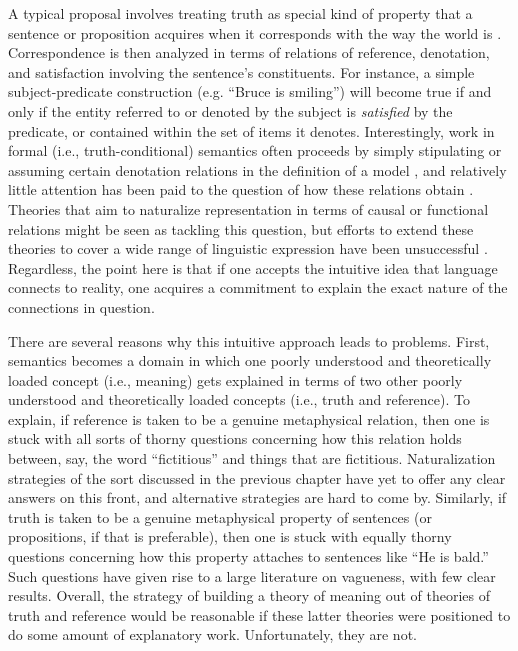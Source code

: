 A typical proposal involves treating truth as special kind of property that a sentence or proposition acquires when it corresponds with the way the world is \citep{Glanzberg:2013}. Correspondence is then analyzed in terms of relations of reference, denotation, and satisfaction involving the sentence's constituents. For instance, a simple subject-predicate construction (e.g. ``Bruce is smiling'') will become true if and only if the entity referred to or denoted by the subject is \textit{satisfied} by the predicate, or contained within the set of items it denotes. Interestingly, work in formal (i.e., truth-conditional) semantics often proceeds by simply stipulating or assuming certain denotation relations in the definition of a model \citep{Carpenter:1997}, and relatively little attention has been paid to the question of how these relations obtain \citep{Stanley:2008}. Theories that aim to naturalize representation in terms of causal or functional relations might be seen as tackling this question, but efforts to extend these theories to cover a wide range of linguistic expression have been unsuccessful \citep[c.f.][]{Millikan:2005}. Regardless, the point here is that if one accepts the intuitive idea that language connects to reality, one acquires a commitment to explain the exact nature of the connections in question.

There are several reasons why this intuitive approach leads to problems. First, semantics becomes a domain in which one poorly understood and theoretically loaded concept (i.e., meaning) gets explained in terms of two other poorly understood and theoretically loaded concepts (i.e., truth and reference). To explain, if reference is taken to be a genuine metaphysical relation, then one is stuck with all sorts of thorny questions concerning how this relation holds between, say, the word ``fictitious'' and things that are fictitious. Naturalization strategies of the sort discussed in the previous chapter have yet to offer any clear answers on this front, and alternative strategies are hard to come by. Similarly, if truth is taken to be a genuine metaphysical property of sentences (or propositions, if that is preferable), then one is stuck with equally thorny questions concerning how this property attaches to sentences like ``He is bald.'' Such questions have given rise to a large literature on vagueness, with few clear results. Overall, the strategy of building a theory of meaning out of theories of truth and reference would be reasonable if these latter theories were positioned to do some amount of explanatory work. Unfortunately, they are not. 

